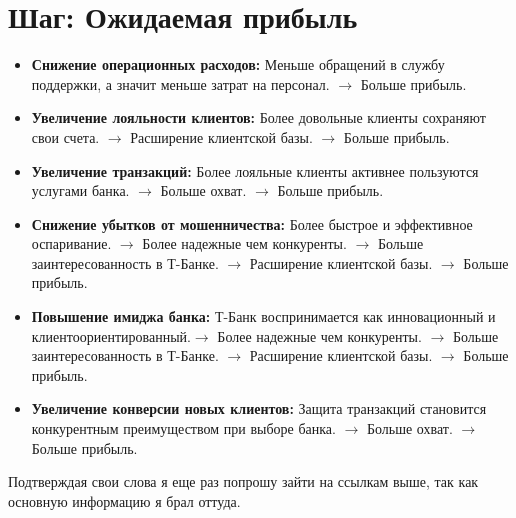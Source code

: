 \documentclass[12pt,a4paper]{article}
\begin{document}
\section{Шаг: Ожидаемая прибыль}
\begin{itemize}
    \item \textbf{Снижение операционных расходов:} Меньше обращений в службу поддержки, а значит меньше затрат на персонал. $\longrightarrow$ Больше прибыль.
    \item \textbf{Увеличение лояльности клиентов:} Более довольные клиенты сохраняют свои счета. $\longrightarrow$ Расширение клиентской базы. $\longrightarrow$ Больше прибыль.
    \item \textbf{Увеличение транзакций:} Более лояльные клиенты активнее пользуются услугами банка. $\longrightarrow$ Больше охват. $\longrightarrow$ Больше прибыль.
    \item \textbf{Снижение убытков от мошенничества:} Более быстрое и эффективное оспаривание. $\longrightarrow$ Более надежные чем конкуренты. $\longrightarrow$ Больше заинтересованность в Т-Банке. $\longrightarrow$ Расширение клиентской базы. $\longrightarrow$ Больше прибыль.
    \item \textbf{Повышение имиджа банка:} Т-Банк воспринимается как инновационный и \\клиентоориентированный.$\longrightarrow$ Более надежные чем конкуренты. $\longrightarrow$ Больше заинтересованность в Т-Банке. $\longrightarrow$ Расширение клиентской базы. $\longrightarrow$ Больше прибыль.
    \item \textbf{Увеличение конверсии новых клиентов:} Защита транзакций становится конкурентным преимуществом при выборе банка. $\longrightarrow$ Больше охват. $\longrightarrow$ Больше прибыль.
\end{itemize}
Подтверждая свои слова я еще раз попрошу зайти на ссылкам выше, так как основную информацию я брал оттуда.
\end{document}
